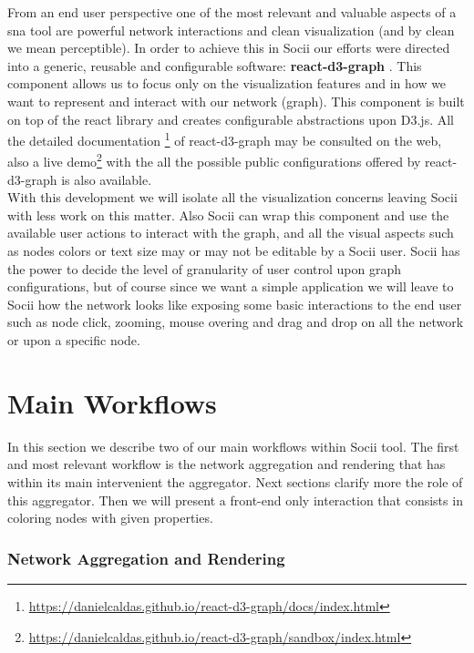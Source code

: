 From an end user perspective one of the most relevant and valuable aspects of a \gls{sna} tool are powerful network interactions and clean visualization (and by clean we mean perceptible). In order to achieve this in Socii our efforts were directed into a generic, reusable and configurable software: \textbf{react-d3-graph} \citep{reactd3graph}. This component allows us to focus only on the visualization features and in how we want to represent and interact with our network (graph). This component is built on top of the react library and creates configurable abstractions upon D3.js. All the detailed documentation \footnote{\url{https://danielcaldas.github.io/react-d3-graph/docs/index.html}} of react-d3-graph
may be consulted on the web, also a live demo\footnote{\url{https://danielcaldas.github.io/react-d3-graph/sandbox/index.html}} with the all the possible public configurations offered by react-d3-graph is also available.\\
With this development we will isolate all the visualization concerns leaving Socii with less work on this matter. Also Socii can wrap this component and use the available user actions to interact with the graph, and all the visual aspects such as nodes colors or text size may or may not be editable by a Socii user. Socii has the power to decide the level of granularity of user control upon graph configurations, but of course since we want a simple application we will leave to Socii how the network looks like exposing some basic interactions to the end user such as node click, zooming, mouse overing and drag and drop on all the network or upon a specific node.

\section{Main Workflows}

In this section we describe two of our main workflows within Socii tool. The first and most relevant workflow is the network aggregation and rendering that has within its main intervenient the aggregator. Next sections clarify more the role of this aggregator. Then we will present a front-end only interaction that consists in coloring nodes with given properties.

\subsubsection{Network Aggregation and Rendering}

